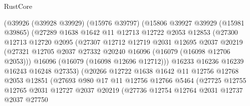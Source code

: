 \begin{lexlean}{RustCore}
\begin{coremodule}
                    (@39926
                      (@39928 @39929)
                      (@15976 @39797)
                      (@15806
                        @39927
                        @39929
                        (@15981 @39865)
                        (@27289
                          @1638
                          @1642
                          @11
                          @12713
                          @12722
                          @2053
                          @12853
                          (@27300
                            @12713
                            @12720
                            @2095
                            (@27307
                              @12712
                              @12719
                              @2031
                              @12695
                              @2037
                              @20219
                              (@27321
                                @12705
                                @2037
                                @27332
                                @20240
                                @16096
                                (@16079 (@16098 @12706 @2053)))
                              @16096
                              (@16079 (@16098 @12696 @12712)))
                            @16233
                            @16236
                            @16239
                            @16243
                            @16248
                            @27353)
                          (@20266
                            @12722
                            @1638
                            @1642
                            @11
                            @12756
                            @12768
                            @2053
                            @12851
                            (@27693
                              @980
                              @17
                              @11
                              @12756
                              @12766
                              @5464
                              (@27725
                                @12755
                                @12765
                                @2031
                                @12727
                                @2037
                                @20219
                                (@27736
                                  @12754
                                  @12764
                                  @2031
                                  @12737
                                  @2037
                                  @27750

\end{coremodule}
\end{lexlean}
